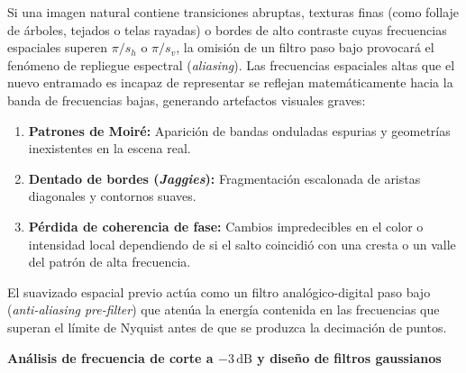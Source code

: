 \documentclass[11pt]{article}
\begin{document}
Si una imagen natural contiene transiciones abruptas, texturas finas (como follaje de árboles, tejados o telas rayadas) o bordes de alto contraste cuyas frecuencias espaciales superen $\pi/s_h$ o $\pi/s_v$, la omisión de un filtro paso bajo provocará el fenómeno de repliegue espectral (\textit{aliasing}). Las frecuencias espaciales altas que el nuevo entramado es incapaz de representar se reflejan matemáticamente hacia la banda de frecuencias bajas, generando artefactos visuales graves:
\begin{enumerate}[itemsep=0.2em]
\item \textbf{Patrones de Moiré:} Aparición de bandas onduladas espurias y geometrías inexistentes en la escena real.
\item \textbf{Dentado de bordes (\textit{Jaggies}):} Fragmentación escalonada de aristas diagonales y contornos suaves.
\item \textbf{Pérdida de coherencia de fase:} Cambios impredecibles en el color o intensidad local dependiendo de si el salto coincidió con una cresta o un valle del patrón de alta frecuencia.
\end{enumerate}

El suavizado espacial previo actúa como un filtro analógico-digital paso bajo (\textit{anti-aliasing pre-filter}) que atenúa la energía contenida en las frecuencias que superan el límite de Nyquist antes de que se produzca la decimación de puntos.

\textbf{Análisis de frecuencia de corte a $-3\,\text{dB}$ y diseño de filtros gaussianos}
\end{document}
